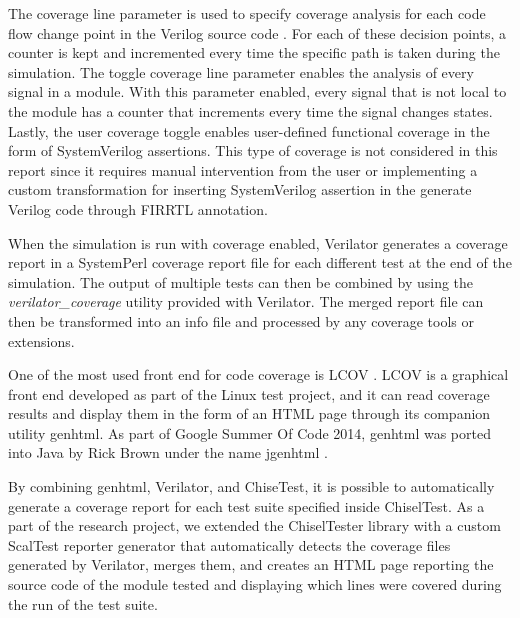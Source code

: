 \documentclass[conference]{IEEEtran}
\begin{document}
The coverage line parameter is used to specify coverage analysis for each code flow change point in the Verilog source code \cite{verilatormanual}. For each of these decision points, a counter is kept and incremented every time the specific path is taken during the simulation. The toggle coverage line parameter enables the analysis of every signal in a module. With this parameter enabled, every signal that is not local to the module has a counter that increments every time the signal changes states. Lastly, the user coverage toggle enables user-defined functional coverage in the form of SystemVerilog assertions. This type of coverage is not considered in this report since it requires manual intervention from the user or implementing a custom transformation for inserting SystemVerilog assertion in the generate Verilog code through FIRRTL annotation.

When the simulation is run with coverage enabled, Verilator generates a coverage report in a SystemPerl \cite{SystemPerl} coverage report file for each different test at the end of the simulation. The output of multiple tests can then be combined by using the \textit{verilator\_coverage} utility provided with Verilator. The merged report file can then be transformed into an info file and processed by any coverage tools or extensions.

One of the most used front end for code coverage is LCOV \cite{Lcov}. LCOV is a graphical front end developed as part of the Linux test project, and it can read coverage results and display them in the form of an HTML page through its companion utility genhtml. As part of Google Summer Of Code 2014, genhtml was ported into Java by Rick Brown under the name jgenhtml \cite{jgenhtml}.

By combining genhtml, Verilator, and ChiseTest, it is possible to automatically generate a coverage report for each test suite specified inside ChiselTest. As a part of the research project, we extended the ChiselTester library with a custom ScalTest reporter generator that automatically detects the coverage files generated by Verilator, merges them, and creates an HTML page reporting the source code of the module tested and displaying which lines were covered during the run of the test suite.
\end{document}

